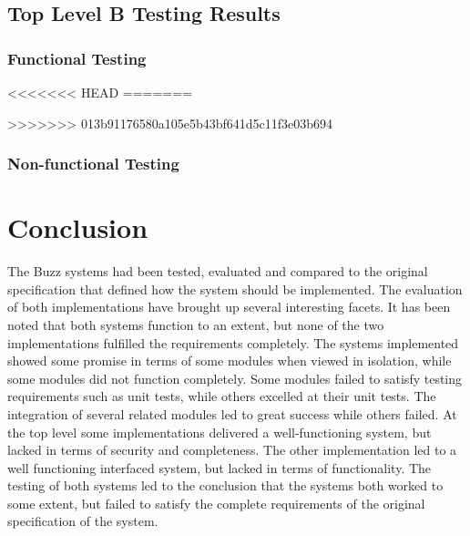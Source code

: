 \documentclass[hidelinks, 12pt, oneside]{article}
\begin{document}
\subsection{Top Level B Testing Results}

\subsubsection{Functional Testing}

\begin{enumerate}






<<<<<<< HEAD
%
=======





>>>>>>> 013b91176580a105e5b43bf641d5c11f3e03b694
\end{enumerate}

\subsubsection{Non-functional Testing} 

\begin{enumerate}








\end{enumerate}

\newpage
\section{Conclusion}

The Buzz systems had been tested, evaluated and compared to the original specification that defined how the system should be implemented. The evaluation of both implementations have brought up several interesting facets. It has been noted that both systems function to an extent, but none of the two implementations fulfilled the requirements completely. The systems implemented showed some promise in terms of some modules when viewed in isolation, while some modules did not function completely. Some modules failed to satisfy testing requirements such as unit tests, while others excelled at their unit tests. The integration of several related modules led to great success while others failed. At the top level some implementations delivered a well-functioning system, but lacked in terms of security and completeness. The other implementation led to a well functioning interfaced system, but lacked in terms of functionality. The testing of both systems led to the conclusion that the systems both worked to some extent, but failed to satisfy the complete requirements of the original specification of the system.
\end{document}
